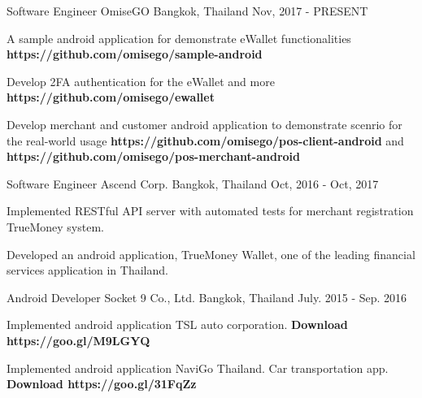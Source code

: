 

\begin{cventries}

  \cventry
    {Software Engineer}
    {OmiseGO}
    {Bangkok, Thailand}
    {Nov, 2017 - PRESENT}
    {
      \begin{cvitems}
        \item {A sample android application for demonstrate eWallet functionalities \textbf{https://github.com/omisego/sample-android}}
        \item {Develop 2FA authentication for the eWallet and more \textbf{https://github.com/omisego/ewallet}}  
        \item {Develop merchant and customer android application to demonstrate scenrio for the real-world usage \textbf{https://github.com/omisego/pos-client-android} and \textbf{https://github.com/omisego/pos-merchant-android}}
      \end{cvitems}
    }

  \cventry
    {Software Engineer} %
    {Ascend Corp.} %
    {Bangkok, Thailand} %
    {Oct, 2016 - Oct, 2017} %
    {
      \begin{cvitems} %
        \item {Implemented RESTful API server with automated tests for merchant registration TrueMoney system.}
        \item {Developed an android application, TrueMoney Wallet, one of the leading financial services application in Thailand.}
      \end{cvitems}
    }

  \cventry
    {Android Developer} %
    {Socket 9 Co., Ltd.} %
    {Bangkok, Thailand} %
    {July. 2015 - Sep. 2016} %
    {
      \begin{cvitems} %
        \item {Implemented android application TSL auto corporation. \textbf{Download https://goo.gl/M9LGYQ}}
        \item {Implemented android application NaviGo Thailand. Car transportation app. \textbf{Download https://goo.gl/31FqZz}}
      \end{cvitems}
    }

\end{cventries}
